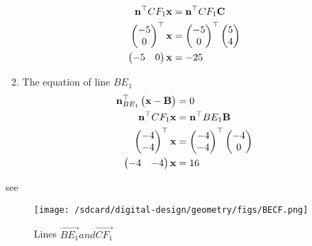 \documentclass[11pt]{book}
\begin{document}
\begin{enumerate}[label=\thesection.\arabic*.,ref=\thesection.\theenumi]
\begin{enumerate}
\begin{align}
          \mathbf{n}^{\top}{CF_1}\mathbf{x}&= \mathbf{n}^{\top}{CF_1}\mathbf{C} \\
          \begin{pmatrix}-5 \\0\end{pmatrix}^{\top}\mathbf{x}&=\begin{pmatrix}-5 \\ 0\end{pmatrix}^{\top}\begin{pmatrix}5 \\ 4\end{pmatrix}\\
          \begin{pmatrix}-5 & 0\end{pmatrix}\mathbf{x}&=-25
      \end{align}
      \item The equation of line $BE_1$
      \begin{align}
          \mathbf{n}^{\top}_{BE_1}\begin{pmatrix}\mathbf{x}-\mathbf{B}\end{pmatrix}&=0 \\
          \mathbf{n}^{\top}{CF_1}\mathbf{x}&= \mathbf{n}^{\top}{BE_1}\mathbf{B} \\
          \begin{pmatrix}-4\\-4\end{pmatrix}^{\top}\mathbf{x}&=\begin{pmatrix}-4 \\ -4\end{pmatrix}^{\top}\begin{pmatrix}-4 \\ 0\end{pmatrix}\\
          \begin{pmatrix}-4 & -4\end{pmatrix}\mathbf{x}&=16
      \end{align}
  \end{enumerate}
  see 
  \begin{figure}[H]
      \centering
      \texttt{[image: /sdcard/digital-design/geometry/figs/BECF.png]}
      \caption{Lines $\vec{BE_1} and \vec{CF_1}$}
      \label{fig:line_BE1_CF1}
  \end{figure}
  


\end{enumerate}
\end{document}
